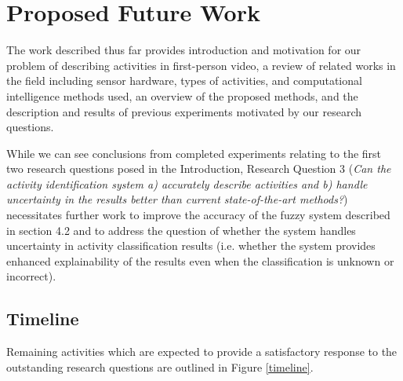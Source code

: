 \documentclass[12pt]{report}
\begin{document}
\chapter{Proposed Future Work}
The work described thus far provides introduction and motivation for our problem of describing activities in first-person video, a review of related works in the field including sensor hardware, types of activities, and computational intelligence methods used, an overview of the proposed methods, and the description and results of previous experiments motivated by our research questions. 

While we can see conclusions from completed experiments relating to the first two research questions posed in the Introduction, Research Question 3 (\emph{Can the activity identification system a) accurately describe activities and b) handle uncertainty in the results better than current state-of-the-art methods?}) necessitates further work to improve the accuracy of the fuzzy system described in section 4.2 and to address the question of whether the system handles uncertainty in activity classification results (i.e. whether the system provides enhanced explainability of the results even when the classification is unknown or incorrect).

\section{Timeline}
Remaining activities which are expected to provide a satisfactory response to the outstanding research questions are outlined in Figure \ref{timeline}.

\end{document}
